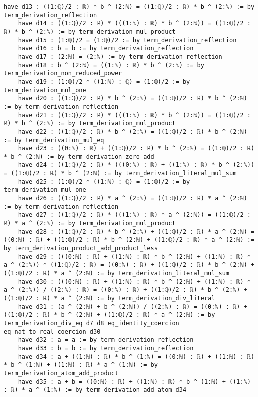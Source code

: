 \documentclass{article}
\begin{document}
\begin{tcolorbox}[colback=white!10, width=\linewidth]
\begin{lstlisting}[language=Lean4]
    have d13 : ((1:ℚ)/2 : ℝ) * b ^ (2:ℕ) = ((1:ℚ)/2 : ℝ) * b ^ (2:ℕ) := by term_derivation_reflection
    have d14 : ((1:ℚ)/2 : ℝ) * (((1:ℕ) : ℝ) * b ^ (2:ℕ)) = ((1:ℚ)/2 : ℝ) * b ^ (2:ℕ) := by term_derivation_mul_product
    have d15 : (1:ℚ)/2 = (1:ℚ)/2 := by term_derivation_reflection
    have d16 : b = b := by term_derivation_reflection
    have d17 : (2:ℕ) = (2:ℕ) := by term_derivation_reflection
    have d18 : b ^ (2:ℕ) = ((1:ℕ) : ℝ) * b ^ (2:ℕ) := by term_derivation_non_reduced_power
    have d19 : (1:ℚ)/2 * ((1:ℕ) : ℚ) = (1:ℚ)/2 := by term_derivation_mul_one
    have d20 : ((1:ℚ)/2 : ℝ) * b ^ (2:ℕ) = ((1:ℚ)/2 : ℝ) * b ^ (2:ℕ) := by term_derivation_reflection
    have d21 : ((1:ℚ)/2 : ℝ) * (((1:ℕ) : ℝ) * b ^ (2:ℕ)) = ((1:ℚ)/2 : ℝ) * b ^ (2:ℕ) := by term_derivation_mul_product
    have d22 : ((1:ℚ)/2 : ℝ) * b ^ (2:ℕ) = ((1:ℚ)/2 : ℝ) * b ^ (2:ℕ) := by term_derivation_mul_eq
    have d23 : ((0:ℕ) : ℝ) + ((1:ℚ)/2 : ℝ) * b ^ (2:ℕ) = ((1:ℚ)/2 : ℝ) * b ^ (2:ℕ) := by term_derivation_zero_add
    have d24 : ((1:ℚ)/2 : ℝ) * (((0:ℕ) : ℝ) + ((1:ℕ) : ℝ) * b ^ (2:ℕ)) = ((1:ℚ)/2 : ℝ) * b ^ (2:ℕ) := by term_derivation_literal_mul_sum
    have d25 : (1:ℚ)/2 * ((1:ℕ) : ℚ) = (1:ℚ)/2 := by term_derivation_mul_one
    have d26 : ((1:ℚ)/2 : ℝ) * a ^ (2:ℕ) = ((1:ℚ)/2 : ℝ) * a ^ (2:ℕ) := by term_derivation_reflection
    have d27 : ((1:ℚ)/2 : ℝ) * (((1:ℕ) : ℝ) * a ^ (2:ℕ)) = ((1:ℚ)/2 : ℝ) * a ^ (2:ℕ) := by term_derivation_mul_product
    have d28 : ((1:ℚ)/2 : ℝ) * b ^ (2:ℕ) + ((1:ℚ)/2 : ℝ) * a ^ (2:ℕ) = ((0:ℕ) : ℝ) + ((1:ℚ)/2 : ℝ) * b ^ (2:ℕ) + ((1:ℚ)/2 : ℝ) * a ^ (2:ℕ) := by term_derivation_product_add_product_less
    have d29 : (((0:ℕ) : ℝ) + ((1:ℕ) : ℝ) * b ^ (2:ℕ) + ((1:ℕ) : ℝ) * a ^ (2:ℕ)) * ((1:ℚ)/2 : ℝ) = ((0:ℕ) : ℝ) + ((1:ℚ)/2 : ℝ) * b ^ (2:ℕ) + ((1:ℚ)/2 : ℝ) * a ^ (2:ℕ) := by term_derivation_literal_mul_sum
    have d30 : (((0:ℕ) : ℝ) + ((1:ℕ) : ℝ) * b ^ (2:ℕ) + ((1:ℕ) : ℝ) * a ^ (2:ℕ)) / ((2:ℕ) : ℝ) = ((0:ℕ) : ℝ) + ((1:ℚ)/2 : ℝ) * b ^ (2:ℕ) + ((1:ℚ)/2 : ℝ) * a ^ (2:ℕ) := by term_derivation_div_literal
    have d31 : (a ^ (2:ℕ) + b ^ (2:ℕ)) / ((2:ℕ) : ℝ) = ((0:ℕ) : ℝ) + ((1:ℚ)/2 : ℝ) * b ^ (2:ℕ) + ((1:ℚ)/2 : ℝ) * a ^ (2:ℕ) := by term_derivation_div_eq d7 d8 eq_identity_coercion eq_nat_to_real_coercion d30
    have d32 : a = a := by term_derivation_reflection
    have d33 : b = b := by term_derivation_reflection
    have d34 : a + ((1:ℕ) : ℝ) * b ^ (1:ℕ) = ((0:ℕ) : ℝ) + ((1:ℕ) : ℝ) * b ^ (1:ℕ) + ((1:ℕ) : ℝ) * a ^ (1:ℕ) := by term_derivation_atom_add_product
    have d35 : a + b = ((0:ℕ) : ℝ) + ((1:ℕ) : ℝ) * b ^ (1:ℕ) + ((1:ℕ) : ℝ) * a ^ (1:ℕ) := by term_derivation_add_atom d34

\end{lstlisting}
\end{tcolorbox}
\end{document}
